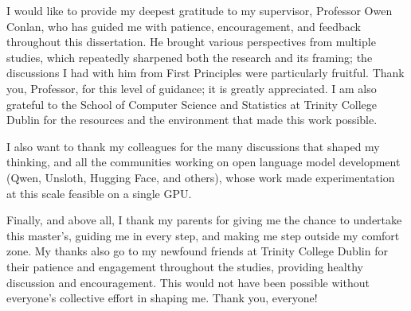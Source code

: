 \documentclass[a4paper, 12pt, oneside]{report}         %
\numberwithin{equation}{chapter}
\numberwithin{algorithm}{chapter}
\begin{document}

\begin{thesisacknowledgments}

I would like to provide my deepest gratitude to my supervisor, Professor Owen Conlan, who has guided me with patience, encouragement, and feedback throughout this dissertation. He brought various perspectives from multiple studies, which repeatedly sharpened both the research and its framing; the discussions I had with him from First Principles were particularly fruitful. Thank you, Professor, for this level of guidance; it is greatly appreciated.  I am also grateful to the School of Computer Science and Statistics at Trinity College Dublin for the resources and the environment that made this work possible. 

I also want to thank my colleagues for the many discussions that shaped my thinking, and all the communities working on open language model development (Qwen, Unsloth, Hugging Face, and others), whose work made experimentation at this scale feasible on a single GPU. 

Finally, and above all, I thank my parents for giving me the chance to undertake this master's, guiding me in every step, and making me step outside my comfort zone. My thanks also go to my newfound friends at Trinity College Dublin for their patience and engagement throughout the studies, providing healthy discussion and encouragement. This would not have been possible without everyone's collective effort in shaping me. Thank you, everyone!

\end{thesisacknowledgments}                       %


\tableofcontents                                  %
\listoftables                                     %
\listoffigures                                    %










{\small                                          %

}                               %


\appendix                                         %
\renewcommand{\thechapter}{A\arabic{chapter}}     %

\end{document}
